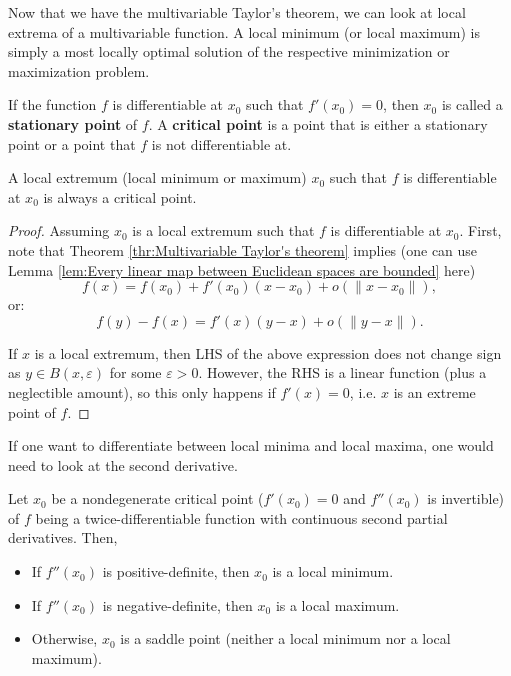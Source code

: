 Now that we have the multivariable Taylor's theorem, we can look at local
extrema of a multivariable function. A local minimum (or local maximum) is simply a most
locally optimal solution of the respective minimization or maximization problem.

\begin{theorem}
\label{thr:Critical point theorem}
  If the function \( f \) is differentiable at \( x_{0} \) such that \(
  f'(x_{0}) = 0 \), then \( x_{0} \) is called a \textbf{stationary point} of \( f
  \). A \textbf{critical point} is a point that is either a stationary point or
  a point that \( f \) is not differentiable at.

  A local extremum (local minimum or maximum) \( x_{0} \) such that \( f \) is
  differentiable at \( x_{0} \) is always a critical point.
\end{theorem}

\begin{proof}
  Assuming \( x_{0} \) is a local extremum such that \( f \) is differentiable
  at \( x_{0} \). First, note that Theorem \ref{thr:Multivariable Taylor's theorem}
  implies (one can use Lemma \ref{lem:Every linear map between Euclidean spaces are
  bounded} here)
  \[
    f(x) = f(x_{0}) + f'(x_{0})(x - x_{0}) + o(\|x - x_{0}\|)
  ,\] or:
  \[
    f(y) - f(x) = f'(x)(y - x) + o(\|y - x\|)
  .\]

  If \( x \) is a local extremum, then LHS of the above expression does not
  change sign as \( y \in B(x, \varepsilon) \) for some \( \varepsilon > 0 \).
  However, the RHS is a linear function (plus a neglectible amount), so this
  only happens if \( f'(x) = 0 \), i.e. \( x \) is an extreme point of \( f \).
\end{proof}

If one want to differentiate between local minima and local maxima, one would
need to look at the second derivative.

\begin{theorem}
\label{thr:Second derivative test}
Let \( x_{0} \) be a nondegenerate critical point (\( f'(x_{0}) = 0 \) and \(
f''(x_{0}) \) is invertible) of \( f \) being a twice-differentiable function
with continuous second partial derivatives. Then,
\begin{itemize}
\item If \( f''(x_{0}) \) is positive-definite, then \( x_{0} \) is a local
  minimum.
\item If \( f''(x_{0}) \) is negative-definite, then \( x_{0} \) is a local
  maximum.
\item Otherwise, \( x_{0} \) is a saddle point (neither a local minimum nor a
  local maximum).
\end{itemize}
\end{theorem}

